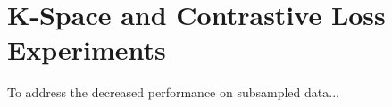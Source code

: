 \documentclass[english,version-2022-01]{uzl-thesis} %
\begin{document}




\section{K-Space and Contrastive Loss Experiments}
To address the decreased performance on subsampled data...
\end{document}
